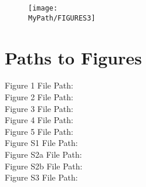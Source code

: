 \documentclass[12pt]{article}
\newcommand*{\MyPath}{..}
\begin{document}
\begin{figure}[!h]
  \texttt{[image: \\MyPath/FIGURES3]}
  \caption{\protect}
  \label{fig:figS3}
\end{figure}

\clearpage
\section{Paths to Figures}
Figure 1 File Path: {\tiny\texttt{}}\\
Figure 2 File Path: {\tiny\texttt{}}\\
Figure 3 File Path: {\tiny\texttt{}}\\
Figure 4 File Path: {\tiny\texttt{}}\\
Figure 5 File Path: {\tiny\texttt{}}\\
Figure S1 File Path: {\tiny\texttt{}}\\
Figure S2a File Path: {\tiny\texttt{}}\\
Figure S2b File Path: {\tiny\texttt{}}\\
Figure S3 File Path: {\tiny\texttt{}}\\
\end{document}
